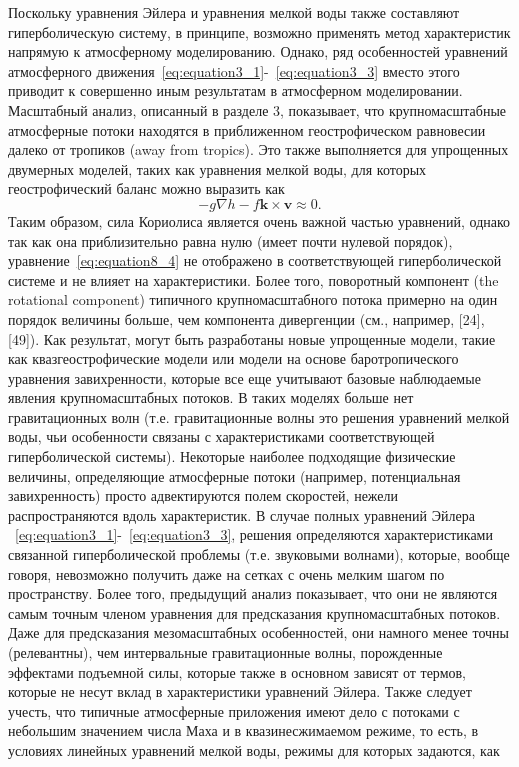 Поскольку уравнения Эйлера и уравнения мелкой воды также составляют гиперболическую систему, в принципе, возможно применять метод характеристик напрямую к атмосферному моделированию. Однако, ряд особенностей уравнений атмосферного движения~\eqref{eq:equation3_1}-~\eqref{eq:equation3_3} вместо этого приводит к совершенно иным результатам в атмосферном моделировании. Масштабный анализ, описанный в разделе 3, показывает, что крупномасштабные атмосферные потоки находятся в приближенном геострофическом равновесии далеко от тропиков (away from tropics). Это также выполняется для упрощенных двумерных моделей, таких как уравнения мелкой воды, для которых геострофический баланс можно выразить как 
%
\begin{equation}
\label{eq:equation8_4}
-g\nabla h - f\mathbf{k}\times\mathbf{v}\approx 0.
\end{equation}
%
Таким образом, сила Кориолиса является очень важной частью уравнений, однако так как она приблизительно равна нулю (имеет почти нулевой порядок), уравнение~\eqref{eq:equation8_4} не отображено в соответствующей гиперболической системе и не влияет на характеристики. Более того, поворотный компонент (the rotational component) типичного крупномасштабного потока примерно на один порядок величины больше, чем компонента дивергенции (см., например, [24], [49]). Как результат, могут быть разработаны новые упрощенные модели, такие как квазгеострофические модели или модели на основе баротропического уравнения завихренности, которые все еще учитывают базовые наблюдаемые явления крупномасштабных потоков. В таких моделях больше нет гравитационных волн (т.е. гравитационные волны это решения уравнений мелкой воды, чьи особенности связаны с характеристиками соответствующей гиперболической системы). Некоторые наиболее подходящие физические величины, определяющие атмосферные потоки (например, потенциальная завихренность) просто адвектируются полем скоростей, нежели распространяются вдоль характеристик. В случае полных уравнений Эйлера ~\eqref{eq:equation3_1}-~\eqref{eq:equation3_3}, решения определяются характеристиками связанной гиперболической проблемы (т.е. звуковыми волнами), которые, вообще говоря, невозможно получить даже на сетках с очень мелким шагом по пространству. Более того, предыдущий анализ показывает, что они не являются самым точным членом уравнения для предсказания крупномасштабных потоков. Даже для предсказания мезомасштабных особенностей, они намного менее точны (релевантны), чем интервальные гравитационные волны, порожденные эффектами подъемной силы, которые также в основном зависят от термов, которые не несут вклад в характеристики уравнений Эйлера. Также следует учесть, что типичные атмосферные приложения имеют дело с потоками с небольшим значением числа Маха и в квазинесжимаемом режиме, то есть, в условиях линейных уравнений мелкой воды, режимы для которых задаются, как
